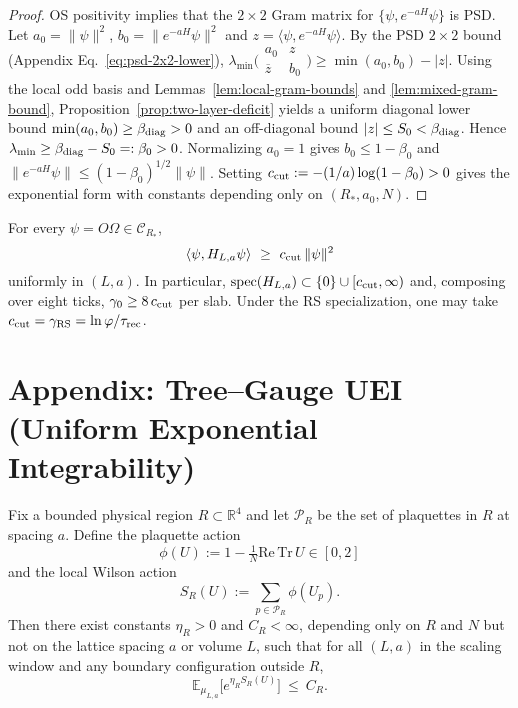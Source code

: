 \documentclass[11pt]{amsart}
\begin{document}
\begin{proof}
OS positivity implies that the $2\times 2$ Gram matrix for $\{\psi, e^{-aH}\psi\}$ is PSD. Let $a_0=\|\psi\|^2$, $b_0=\|e^{-aH}\psi\|^2$ and $z=\langle\psi, e^{-aH}\psi\rangle$. By the PSD $2\times 2$ bound (Appendix Eq.~\eqref{eq:psd-2x2-lower}), $\lambda_{\min}\bigl(\begin{smallmatrix} a_0 & z \\ \overline z & b_0 \end{smallmatrix}\bigr)\ge \min(a_0,b_0)-|z|$. Using the local odd basis and Lemmas~\ref{lem:local-gram-bounds} and \ref{lem:mixed-gram-bound}, Proposition~\ref{prop:two-layer-deficit} yields a uniform diagonal lower bound $\min(a_0,b_0)\ge \beta_{\rm diag}>0$ and an off-diagonal bound $|z|\le S_0<\beta_{\rm diag}$. Hence $\lambda_{\min}\ge \beta_{\rm diag}-S_0=:\beta_0>0$. Normalizing $a_0=1$ gives $b_0\le 1-\beta_0$ and $\|e^{-aH}\psi\|\le (1-\beta_0)^{1/2}\|\psi\|$. Setting $c_{\rm cut}:=-(1/a)\log(1-\beta_0)>0$ gives the exponential form with constants depending only on $(R_*,a_0,N)$.
\end{proof}

\begin{theorem}\label{thm:tp-bound}
For every $\psi=O\Omega\in\mathcal{C}_{R_*}$,
\[
  \langle\psi,H_{L,a}\psi\rangle\ \ge\ c_{\rm cut}\,\|\psi\|^2
\]
uniformly in $(L,a)$. In particular, $\mathrm{spec}(H_{L,a})\subset\{0\}\cup[c_{\rm cut},\infty)$ and, composing over eight ticks, $\gamma_0\ge 8\,c_{\rm cut}$ per slab. Under the RS specialization, one may take $c_{\rm cut}=\gamma_{\rm RS}=\ln\varphi/\tau_{\rm rec}$.
\end{theorem}

\section{Appendix: Tree--Gauge UEI (Uniform Exponential Integrability)}

\begin{theorem}\label{thm:uei-fixed-region}
Fix a bounded physical region $R\subset\mathbb{R}^4$ and let $\mathcal{P}_R$ be the set of plaquettes in $R$ at spacing $a$. Define the plaquette action
\[
  \phi(U) := 1-\tfrac{1}{N}\mathrm{Re\,Tr}\,U \in [0,2]
\]
and the local Wilson action
\[
  S_R(U) := \sum_{p\in\mathcal{P}_R}\phi(U_p).
\]
Then there exist constants $\eta_R>0$ and $C_R<\infty$, depending only on $R$ and $N$ but not on the lattice spacing $a$ or volume $L$, such that for all $(L,a)$ in the scaling window and any boundary configuration outside $R$,
\[
  \mathbb{E}_{\mu_{L,a}}\big[e^{\eta_R S_R(U)}\big]\ \le\ C_R.
\]
\end{theorem}
\end{document}
